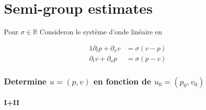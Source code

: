 \documentclass[a4paper,11pt]{article}
\begin{document}
\part*{Semi-group estimates}
Pour \begin{math}\sigma \in \mathbb{R}\end{math}
Consideron le système d'onde linéaire en 

\renewcommand{\theequation}{\Roman{equation}}

\begin{alignat}{1}
    \partial_{t}p + \partial_{x}v &= \sigma(v-p) \label{I} \\
    \partial_{t}v + \partial_{x}p &= \sigma(p-v) \label{II}
\end{alignat}

\setcounter{equation}{0}
\renewcommand{\theequation}{\arabic{equation}}


\section{Determine \begin{math}u = (p, v)\end{math} en fonction de \begin{math}u_{0} = (p_{0}, v_{0})\end{math}}
\subsection*{I+II}
\end{document}
